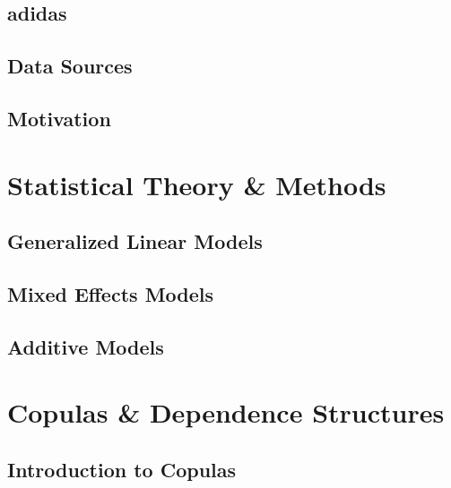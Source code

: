 \documentclass[11pt, twoside]{article}
\numberwithin{equation}{section}
\numberwithin{table}{section}
\numberwithin{figure}{section}
\begin{document}
\subsection{adidas} \label{ssec:adidas}

\subsection{Data Sources} \label{ssec:data_sources}

\subsection{Motivation} \label{ssec:motivation}

%
\newpage
\thispagestyle{empty}
\cleardoublepage

\thispagestyle{plain}
\section{Statistical Theory \& Methods} \label{sec:theory_and_methods}

\subsection{Generalized Linear Models} \label{ssec:glm}

\subsection{Mixed Effects Models} \label{ssec:mixed_models}

\subsection{Additive Models} \label{ssec:gam}

\newpage
\thispagestyle{empty}
\cleardoublepage

\thispagestyle{plain}
\section{Copulas \& Dependence Structures} \label{sec:copulas_and_dependence_structures}

\subsection{Introduction to Copulas} \label{ssec:intro_to_copulas}

\end{document}
